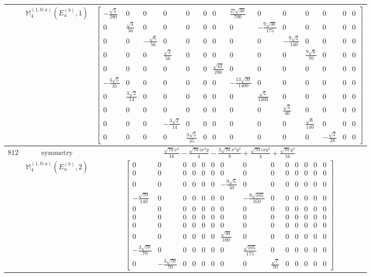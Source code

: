 \documentclass[fleqn,8pt,landscape]{jsarticle}
\begin{document}
\begin{longtable}{ccc}
$  $ & $ \mathbb{M}_{4}^{(1,0;a)}(E_{u}^{(b)},1) $ & $ \begin{bmatrix} - \frac{\sqrt{5}}{280} & 0 & 0 & 0 & 0 & 0 & 0 & \frac{27 \sqrt{30}}{700} & 0 & 0 & 0 & 0 & 0 & 0 \\ 0 & \frac{\sqrt{3}}{56} & 0 & 0 & 0 & 0 & 0 & 0 & - \frac{9 \sqrt{30}}{175} & 0 & 0 & 0 & 0 & 0 \\ 0 & 0 & - \frac{\sqrt{6}}{56} & 0 & 0 & 0 & 0 & 0 & 0 & - \frac{9 \sqrt{2}}{140} & 0 & 0 & 0 & 0 \\ 0 & 0 & 0 & \frac{\sqrt{2}}{56} & 0 & 0 & 0 & 0 & 0 & 0 & \frac{9 \sqrt{6}}{70} & 0 & 0 & 0 \\ 0 & 0 & 0 & 0 & 0 & 0 & \frac{\sqrt{42}}{280} & 0 & 0 & 0 & 0 & 0 & 0 & 0 \\ - \frac{3 \sqrt{5}}{35} & 0 & 0 & 0 & 0 & 0 & 0 & - \frac{13 \sqrt{30}}{1400} & 0 & 0 & 0 & 0 & 0 & 0 \\ 0 & \frac{3 \sqrt{2}}{14} & 0 & 0 & 0 & 0 & 0 & 0 & \frac{\sqrt{5}}{1400} & 0 & 0 & 0 & 0 & 0 \\ 0 & 0 & 0 & 0 & 0 & 0 & 0 & 0 & 0 & \frac{\sqrt{3}}{40} & 0 & 0 & 0 & 0 \\ 0 & 0 & 0 & - \frac{3 \sqrt{2}}{14} & 0 & 0 & 0 & 0 & 0 & 0 & \frac{\sqrt{6}}{140} & 0 & 0 & 0 \\ 0 & 0 & 0 & 0 & \frac{3 \sqrt{5}}{35} & 0 & 0 & 0 & 0 & 0 & 0 & - \frac{\sqrt{2}}{28} & 0 & 0 \end{bmatrix} $ \\ \hline
$ 812 $ & $ \text{symmetry} $ & $ \frac{\sqrt{70} x^{4}}{16} - \frac{\sqrt{70} i x^{3} y}{4} - \frac{3 \sqrt{70} x^{2} y^{2}}{8} + \frac{\sqrt{70} i x y^{3}}{4} + \frac{\sqrt{70} y^{4}}{16} $ \\
$  $ & $ \mathbb{M}_{4}^{(1,0;a)}(E_{u}^{(b)},2) $ & $ \begin{bmatrix} 0 & 0 & 0 & 0 & 0 & 0 & 0 & 0 & 0 & 0 & 0 & 0 & 0 & 0 \\ 0 & 0 & 0 & 0 & 0 & 0 & 0 & 0 & 0 & 0 & 0 & 0 & 0 & 0 \\ 0 & 0 & 0 & 0 & 0 & 0 & - \frac{9 \sqrt{5}}{50} & 0 & 0 & 0 & 0 & 0 & 0 & 0 \\ - \frac{\sqrt{70}}{140} & 0 & 0 & 0 & 0 & 0 & 0 & - \frac{9 \sqrt{105}}{350} & 0 & 0 & 0 & 0 & 0 & 0 \\ 0 & 0 & 0 & 0 & 0 & 0 & 0 & 0 & 0 & 0 & 0 & 0 & 0 & 0 \\ 0 & 0 & 0 & 0 & 0 & 0 & 0 & 0 & 0 & 0 & 0 & 0 & 0 & 0 \\ 0 & 0 & 0 & 0 & 0 & 0 & 0 & 0 & 0 & 0 & 0 & 0 & 0 & 0 \\ 0 & 0 & 0 & 0 & 0 & 0 & \frac{\sqrt{30}}{100} & 0 & 0 & 0 & 0 & 0 & 0 & 0 \\ - \frac{3 \sqrt{70}}{70} & 0 & 0 & 0 & 0 & 0 & 0 & \frac{\sqrt{105}}{175} & 0 & 0 & 0 & 0 & 0 & 0 \\ 0 & - \frac{3 \sqrt{70}}{70} & 0 & 0 & 0 & 0 & 0 & 0 & \frac{\sqrt{7}}{70} & 0 & 0 & 0 & 0 & 0 \end{bmatrix} $ \\ \hline

\end{longtable}
\end{document}
